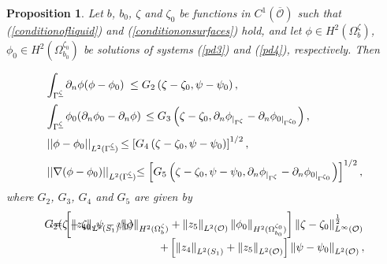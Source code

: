 \documentclass[11pt]{article}
\newtheorem{proposition}[theorem]{Proposition}
\begin{document}
\begin{proposition}\label{lemmaaboutupperboundofinte}
	Let $b$, $b_0$, $\zeta$ and $\zeta_0$ be functions in  $C^1\left(\overline{\mathcal O}\right)$ such that (\ref{conditionofliquid}) and (\ref{conditiononsurfaces}) hold, and  let  $\phi\in H^2(\Omega^{\zeta}_{b})$, $\phi_0\in H^2(\Omega^{\zeta_0}_{b_0})$ be solutions of systems (\ref{pd3}) and (\ref{pd4}), respectively. Then
	
	\begin{equation}\label{upperboundsforintegral}
		\begin{array}{ll}
			\vspace{0.2cm}
			\displaystyle\int_{\Gamma^{\underline{\zeta}}} \partial_n\phi(\phi-\phi_0)&\hspace{-0.7cm}\leq G_2\left(\zeta-\zeta_0,\psi-\psi_0\right),\\
			\vspace{0.2cm}
			\displaystyle\int_{\Gamma^{\underline{\zeta}}} \phi_0(\partial_n\phi_0-\partial_n\phi)&\hspace{-0.2cm}\leq G_3\left(\zeta-\zeta_0,\partial_n\phi_{|_{\Gamma^{\zeta}}}-\partial_n\phi_{0|_{\Gamma^{\zeta_0}}}\right),\\
			\vspace{0.2cm}
			||\phi-\phi_0||_{L^2(\Gamma^{\underline{\zeta}})}&\hspace{-1cm}\leq \left[G_4\left(\zeta-\zeta_0,\psi-\psi_0\right)\right]^{1/2},\\
			||\nabla (\phi-\phi_0)||_{L^2(\Gamma^{\underline{\zeta}})}&\hspace{-0.5cm}\leq \left[G_5\left(\zeta-\zeta_0,\psi-\psi_0,\partial_n\phi_{|_{\Gamma^{\zeta}}}-\partial_n\phi_{0|_{\Gamma^{\zeta_0}}}\right)\right]^{1/2},
		\end{array}    
	\end{equation}
	where  $G_2$, $G_3$, $G_4$ and $G_5$ are given by
	\begin{equation}\label{G2to4exprsl}
		\begin{array}{ll}
			G_2(\zeta-\zeta_0,\psi-\psi_0)&\hspace{-3cm} :=\left[\left\Vert   z_4\right\Vert_{L^2(S_1)}\left\Vert\phi\right\Vert_{H^2(\Omega_{b}^{\zeta})} +\left\Vert   z_5\right\Vert_{L^2(\mathcal O)}\left\Vert\phi_0\right\Vert_{H^2(\Omega_{b_0}^{\zeta_0})} \right] \left\Vert \zeta-\zeta_0  \right\Vert_{L^{\infty}(\mathcal O )}^{\frac{1}{2}}\\\vspace{0.3cm}
			&\hspace{0.5cm}+\left[\left\Vert   z_4\right\Vert_{L^2(S_1)} +\left\Vert   z_5\right\Vert_{L^2(\mathcal O)} \right] \left\Vert   \psi-\psi_0 \right\Vert_{L^2(\mathcal O )},\\

\end{array}
\end{equation}
\end{proposition}
\end{document}
